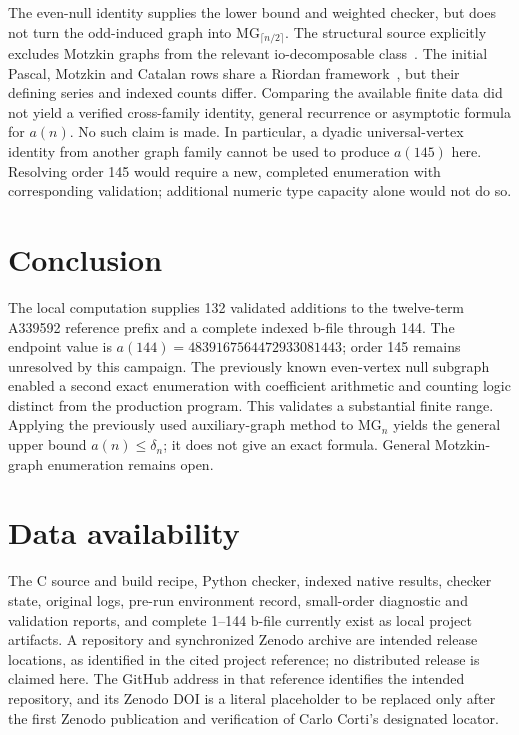 \documentclass[11pt,a4paper]{article}
\newcommand{\MG}{\mathrm{MG}}
\begin{document}
The even-null identity supplies the lower bound and weighted checker, but
does not turn the odd-induced graph into $\MG_{\lceil n/2\rceil}$.
The structural source explicitly excludes Motzkin graphs from the relevant
io-decomposable class~\cite{structure}.  The initial Pascal, Motzkin and
Catalan rows share a Riordan framework~\cite{counting}, but their defining
series and indexed counts differ.  Comparing the available finite data
did not yield a verified cross-family identity, general recurrence or
asymptotic formula for $a(n)$.  No such claim is made.  In particular, a
dyadic universal-vertex identity from another graph family cannot be used
to produce $a(145)$ here.  Resolving order 145 would require a new,
completed enumeration with corresponding validation; additional numeric
type capacity alone would not do so.

\section{Conclusion}
The local computation supplies 132 validated additions to the twelve-term
A339592 reference prefix and a complete indexed b-file through 144.
The endpoint value is $a(144)=4839167564472933081443$; order 145 remains
unresolved by this campaign.  The previously known even-vertex null
subgraph enabled a
second exact enumeration with coefficient arithmetic and counting logic
distinct from the production program.  This validates a substantial finite
range.  Applying the previously used auxiliary-graph method to $\MG_n$
yields the general upper bound $a(n)\leq\delta_n$; it does not give
an exact formula.  General Motzkin-graph enumeration remains open.

\section*{Data availability}
The C source and build recipe, Python checker, indexed native results,
checker state, original logs, pre-run environment record, small-order
diagnostic and validation reports, and complete 1--144 b-file
currently exist as local project artifacts.  A repository and synchronized
Zenodo archive are intended release locations, as identified in the cited
project reference; no distributed release is claimed here.  The GitHub
address in that reference identifies the intended repository, and its
Zenodo DOI is a literal placeholder to be replaced only after the first
Zenodo publication and verification of Carlo Corti's designated locator.
\end{document}
